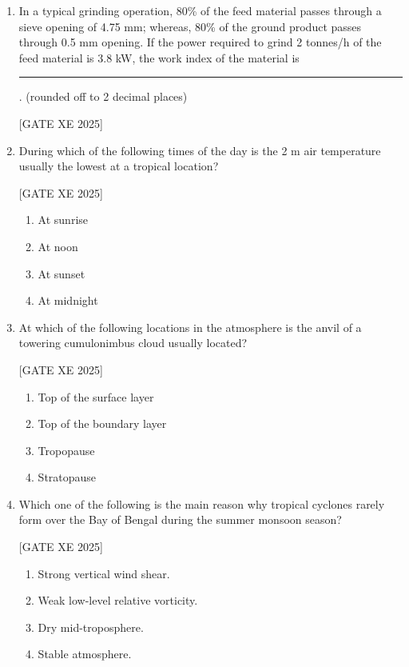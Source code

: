 \documentclass[journal,12pt,onecolumn]{IEEEtran}
\theoremstyle{remark}
\begin{document}
\begin{enumerate}
\hfill[GATE XE 2025]

\item In a typical grinding operation, 80\% of the feed material passes through a sieve opening of 4.75 mm; whereas, 80\% of the ground product passes through 0.5 mm opening. If the power required to grind 2 tonnes/h of the feed material is 3.8 kW, the work index of the material is \rule{3cm}{0.15mm}. (rounded off to 2 decimal places)

\hfill[GATE XE 2025]
\item During which of the following times of the day is the 2 m air temperature usually the lowest at a tropical location?

\hfill[GATE XE 2025]

\begin{multicols}{2}
\begin{enumerate}
\item At sunrise
\item At noon
\item At sunset
\item At midnight
\end{enumerate}
\end{multicols}

\item At which of the following locations in the atmosphere is the anvil of a towering cumulonimbus cloud usually located?

\hfill[GATE XE 2025]

\begin{multicols}{2}
\begin{enumerate}
\item Top of the surface layer
\item Top of the boundary layer
\item Tropopause
\item Stratopause
\end{enumerate}
\end{multicols}

\item Which one of the following is the main reason why tropical cyclones rarely form over the Bay of Bengal during the summer monsoon season?

\hfill[GATE XE 2025]

\begin{multicols}{2}
\begin{enumerate}
\item Strong vertical wind shear.
\item Weak low-level relative vorticity.
\item Dry mid-troposphere.
\item Stable atmosphere.
\end{enumerate}
\end{multicols}


\end{enumerate}
\end{document}
